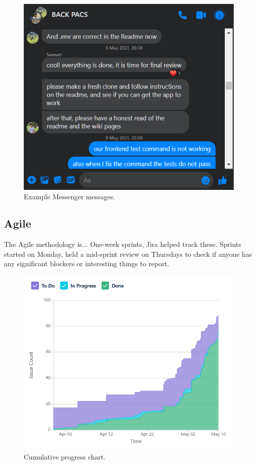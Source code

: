 \documentclass[conference]{IEEEtran}
\begin{document}
\begin{figure}[htbp]
\centerline{\includegraphics[width = \linewidth]{messenger.png}}
\caption{Example Messenger messages.}
\label{messenger}
\end{figure}

\subsection{Agile}
The Agile methodology is...
One-week sprints, Jira helped track these. Sprints started on Monday, held a mid-sprint review on Thursdays to check if anyone has any significant blockers or interesting things to report.



\begin{figure}[htbp]
\centerline{\includegraphics[width = \linewidth]{cumulative-flow-diagram.png}}
\caption{Cumulative progress chart.}
\label{progress}
\end{figure}
\end{document}
